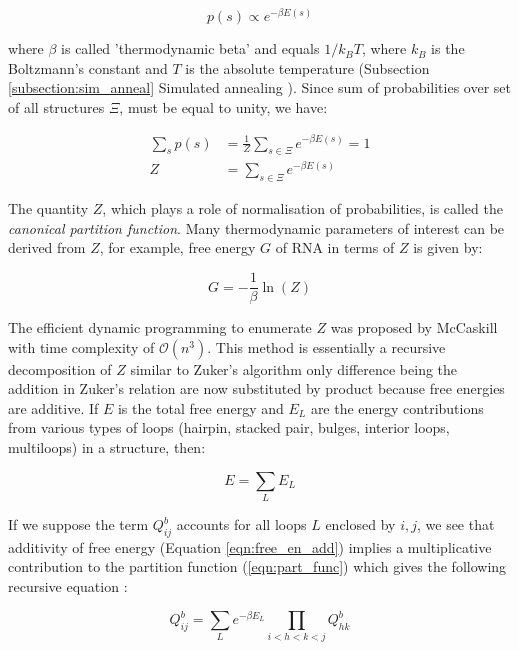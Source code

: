 \begin{equation}
    p(s) \propto e^{-\beta E(s)}
\end{equation}

where $\beta$ is called 'thermodynamic beta' and equals $1/k_B T$, where $k_B$ is the Boltzmann's constant and $T$ is the absolute temperature (Subsection \ref{subsection:sim_anneal} Simulated annealing ). Since sum of probabilities over set of all structures $\Xi$, must be equal to unity, we have:

\begin{equation}
\begin{aligned}
    \sum_s p(s) &= \frac{1}{Z} \sum_{s\in\Xi} e^{-\beta E(s)}  = 1  \\
    Z &= \sum_{s\in\Xi} e^{-\beta E(s)} 
\end{aligned}
\label{eqn:part_func}
\end{equation}

The quantity $Z$, which plays a role of normalisation of probabilities, is called the \textit{canonical partition function}. Many thermodynamic parameters of interest can be derived from $Z$, for example, free energy $G$ of RNA in terms of $Z$ is given by:

\begin{equation}
\label{eqn:free_en}
    G = -\frac{1}{\beta} \ln(Z)
\end{equation}

The efficient dynamic programming to enumerate $Z$ was proposed by McCaskill \cite{mccaskill1990equilibrium} with time complexity of $\mathcal{O}(n^{3})$. This method is essentially a recursive decomposition of $Z$ similar to Zuker's algorithm only difference being the addition in Zuker's relation are now substituted by product because free energies are additive. If $E$ is the total free energy and $E_L$ are the energy contributions from various types of loops (hairpin, stacked pair, bulges, interior loops, multiloops) in a structure, then:

\begin{equation}
    E = \sum_L E_L
    \label{eqn:free_en_add}
\end{equation}

If we suppose the term $Q_{ij}^b$ accounts for all loops $L$ enclosed by $i,j$, we see that additivity of free energy (Equation \ref{eqn:free_en_add}) implies a multiplicative contribution to the partition function (\ref{eqn:part_func}) which gives the following recursive equation :

\begin{equation}
    Q_{ij}^b = \sum_L e^{-\beta E_L} \prod_{i<h<k<j} Q_{hk}^b
    \label{eqn:mcc_restr_part}
\end{equation}

